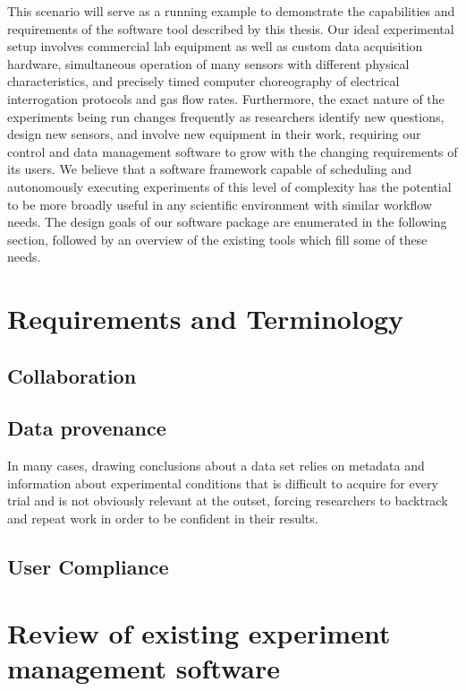 \documentclass[../thesis]{subfiles}
\begin{document}
This scenario will serve as a running example to demonstrate the
capabilities and requirements of the software tool described by this
thesis. Our ideal experimental setup involves commercial lab equipment
as well as custom data acquisition hardware, simultaneous operation of
many sensors with different physical characteristics, and precisely
timed computer choreography of electrical interrogation protocols and
gas flow rates. Furthermore, the exact nature of the experiments being
run changes frequently as researchers identify new questions, design
new sensors, and involve new equipment in their work,
requiring our control and data management software to grow with the
changing requirements of its users. We believe that a software
framework capable of scheduling and autonomously executing experiments
of this level of complexity has the potential to be more broadly
useful in any scientific environment with similar workflow needs. The
design goals of our software package are enumerated in the following section,
followed by an overview of the existing tools which fill some of these needs.



\section{Requirements and Terminology}



\subsection{Collaboration}



\subsection{Data provenance}
In many cases, drawing conclusions about a data set relies on
metadata and information about experimental conditions that is
difficult to acquire for every trial and is not obviously
relevant at the outset, forcing researchers to backtrack and repeat
work in order to be confident in their results.



\subsection{User Compliance}



\section{Review of existing experiment management software}
\end{document}
